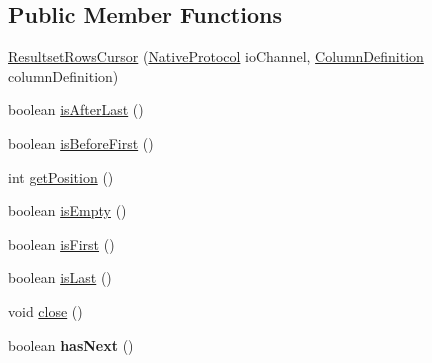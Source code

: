 \subsection*{Public Member Functions}
\begin{DoxyCompactItemize}
\item 
\mbox{\hyperlink{classcom_1_1mysql_1_1cj_1_1protocol_1_1a_1_1result_1_1_resultset_rows_cursor_a001b96f900d4ef21188c3cc2cf8275ec}{Resultset\+Rows\+Cursor}} (\mbox{\hyperlink{classcom_1_1mysql_1_1cj_1_1protocol_1_1a_1_1_native_protocol}{Native\+Protocol}} io\+Channel, \mbox{\hyperlink{interfacecom_1_1mysql_1_1cj_1_1protocol_1_1_column_definition}{Column\+Definition}} column\+Definition)
\item 
boolean \mbox{\hyperlink{classcom_1_1mysql_1_1cj_1_1protocol_1_1a_1_1result_1_1_resultset_rows_cursor_a26d45087615e0f6baa7a8b52d33a0ec4}{is\+After\+Last}} ()
\item 
boolean \mbox{\hyperlink{classcom_1_1mysql_1_1cj_1_1protocol_1_1a_1_1result_1_1_resultset_rows_cursor_a6ca4bec845f7589a9182c52c8f81e0c2}{is\+Before\+First}} ()
\item 
int \mbox{\hyperlink{classcom_1_1mysql_1_1cj_1_1protocol_1_1a_1_1result_1_1_resultset_rows_cursor_ab1ee40d0ad7227af904036a217b226e4}{get\+Position}} ()
\item 
boolean \mbox{\hyperlink{classcom_1_1mysql_1_1cj_1_1protocol_1_1a_1_1result_1_1_resultset_rows_cursor_a3fcb0eaca47918a78033b083af35b02a}{is\+Empty}} ()
\item 
boolean \mbox{\hyperlink{classcom_1_1mysql_1_1cj_1_1protocol_1_1a_1_1result_1_1_resultset_rows_cursor_a8d0ae8e04f7731f461437563ea13c6b9}{is\+First}} ()
\item 
boolean \mbox{\hyperlink{classcom_1_1mysql_1_1cj_1_1protocol_1_1a_1_1result_1_1_resultset_rows_cursor_ae16f7cc758e2518a8cf1c6acfddeed10}{is\+Last}} ()
\item 
void \mbox{\hyperlink{classcom_1_1mysql_1_1cj_1_1protocol_1_1a_1_1result_1_1_resultset_rows_cursor_a51a20849a2912a6869f24911f3334f76}{close}} ()
\item 
\mbox{\label{classcom_1_1mysql_1_1cj_1_1protocol_1_1a_1_1result_1_1_resultset_rows_cursor_af056a90c47de13b8849cdd7ee7957835}} 
boolean {\bfseries has\+Next} ()
\item 
\mbox{\label{classcom_1_1mysql_1_1cj_1_1protocol_1_1a_1_1result_1_1_resultset_rows_cursor_ad45163788fc1ede098e8e24203628ee1}} 

\end{DoxyCompactItemize}
